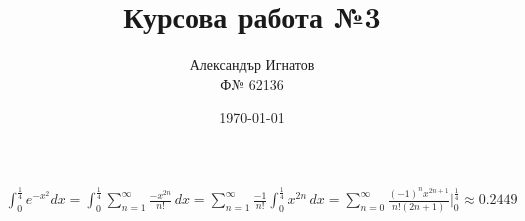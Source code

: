 \documentclass{article}
\title{Курсова работа №3}
\author{Александър Игнатов \\ Ф№ 62136 }
\date{\today}
\begin{document}
\maketitle

\begin{gather*}
    \int_0^\frac{1}{4}e^{-x^2}dx = \int_{0}^{\frac{1}{4}} \sum_{n=1}^{\infty} \frac{-x^{2n}}{n!}  \,dx = \sum_{n=1}^{\infty} \frac{-1}{n!} \int_{0}^{\frac{1}{4}} x^{2n} \,dx  =\sum_{n=0}^{\infty} \frac{(-1)^nx^{2n+1}}{n!(2n+1)}\biggr\rvert_0^\frac{1}{4} \approx 0.2449
\end{gather*}
\end{document}
